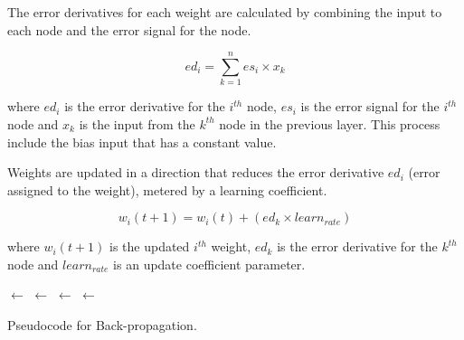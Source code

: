 The error derivatives for each weight are calculated by combining the input to each node and the error signal for the node.

\begin{equation}
	ed_i = \sum_{k=1}^n es_i \times x_k
\end{equation}

where $ed_i$ is the error derivative for the $i^{th}$ node, $es_i$ is the error signal for the $i^{th}$ node and $x_k$ is the input from the $k^{th}$ node in the previous layer. This process include the bias input that has a constant value.

Weights are updated in a direction that reduces the error derivative $ed_i$ (error assigned to the weight), metered by a learning coefficient.

\begin{equation}
	w_i(t+1) = w_i(t) + (ed_k \times learn_{rate})
\end{equation}

where $w_i(t+1)$ is the updated $i^{th}$ weight, $ed_k$ is the error derivative for the $k^{th}$ node and $learn_{rate}$ is an update coefficient parameter.

\begin{algorithm}[ht]
	\SetLine


	
	\KwIn{\ProblemSize, \InputPatterns, \MaxIterations, \LearningRate}		
	\KwOut{\Network}
  
	\Network $\leftarrow$ \ConstructNetworkLayers{}\;
	\NetworkWeights $\leftarrow$ \InitializeWeights{\Network, \ProblemSize}\;
	 {
		\Pattern $\leftarrow$ \SelectInputPattern{\InputPatterns}\;
		\Output $\leftarrow$ \ForwardPropagate{\Pattern, \Network}\;
		\BackwardPropagateError{\Pattern, \Output, \Network}\;		
		\UpdateWeights{\Pattern, \Output, \Network, \LearningRate}\;
	}
	\Return{\Network}\;
	\caption{Pseudocode for Back-propagation.}
	\label{alg:train}
\end{algorithm}

